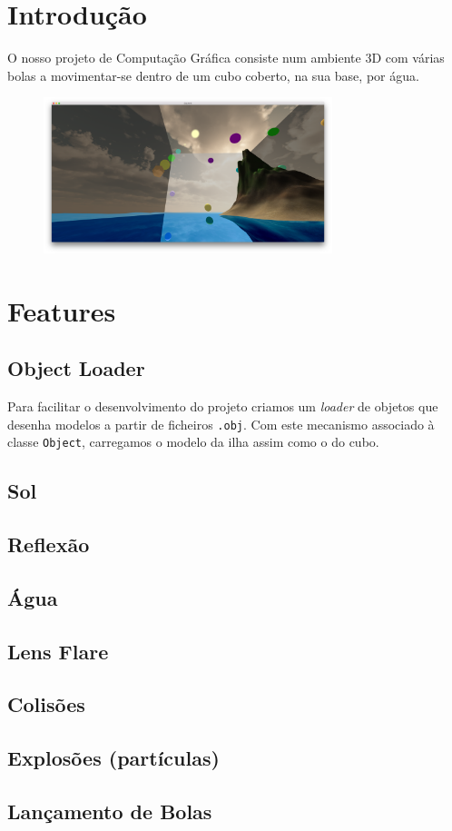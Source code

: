 \documentclass[12pt]{article}
\title{\TitleFont{Computação Gráfica}}
\author{David Gomes (2013136061) \and \vspace{-0.1cm} André Baptista (2013136742)}
\date{}
\begin{document}
\maketitle

\section*{Introdução}
O nosso projeto de Computação Gráfica consiste num ambiente 3D com várias bolas a movimentar-se
dentro de um cubo coberto, na sua base, por água.

\begin{figure}[H]
  \centering
  \includegraphics[width=0.75\textwidth]{screenshot}
\end{figure}

\section*{Features}
\subsection*{Object Loader}
Para facilitar o desenvolvimento do projeto criamos um \textit{loader} de objetos que desenha modelos
a partir de ficheiros \texttt{.obj}. Com este mecanismo associado à classe \texttt{Object}, carregamos o modelo da ilha assim como o do cubo.
\subsection*{Sol}
\subsection*{Reflexão}
\subsection*{Água}
\subsection*{Lens Flare}
\subsection*{Colisões}
\subsection*{Explosões (partículas)}
\subsection*{Lançamento de Bolas}
\end{document}

